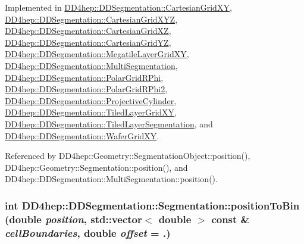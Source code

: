 Implemented in \hyperlink{class_d_d4hep_1_1_d_d_segmentation_1_1_cartesian_grid_x_y_a2a7d50d0a59d37116654b0f6a691f945}{DD4hep::DDSegmentation::CartesianGridXY}, \hyperlink{class_d_d4hep_1_1_d_d_segmentation_1_1_cartesian_grid_x_y_z_a029a72904042397250b67948270884ac}{DD4hep::DDSegmentation::CartesianGridXYZ}, \hyperlink{class_d_d4hep_1_1_d_d_segmentation_1_1_cartesian_grid_x_z_a44fb20b19214cb7a56e1d17e3edf3c5f}{DD4hep::DDSegmentation::CartesianGridXZ}, \hyperlink{class_d_d4hep_1_1_d_d_segmentation_1_1_cartesian_grid_y_z_aaad4f014c52e680a4954971d75d13357}{DD4hep::DDSegmentation::CartesianGridYZ}, \hyperlink{class_d_d4hep_1_1_d_d_segmentation_1_1_megatile_layer_grid_x_y_ab7f4500bd543bd2a837810f130b47539}{DD4hep::DDSegmentation::MegatileLayerGridXY}, \hyperlink{class_d_d4hep_1_1_d_d_segmentation_1_1_multi_segmentation_abbcc00c36274bb97c5ff3d01d64e45b6}{DD4hep::DDSegmentation::MultiSegmentation}, \hyperlink{class_d_d4hep_1_1_d_d_segmentation_1_1_polar_grid_r_phi_a91f53cd5367a3b7472713e2bd214bf57}{DD4hep::DDSegmentation::PolarGridRPhi}, \hyperlink{class_d_d4hep_1_1_d_d_segmentation_1_1_polar_grid_r_phi2_a5a61e856d814397d2be8046585266863}{DD4hep::DDSegmentation::PolarGridRPhi2}, \hyperlink{class_d_d4hep_1_1_d_d_segmentation_1_1_projective_cylinder_a4108a130ccc4573d4204318e975ad8bf}{DD4hep::DDSegmentation::ProjectiveCylinder}, \hyperlink{class_d_d4hep_1_1_d_d_segmentation_1_1_tiled_layer_grid_x_y_a1cf88ec570ea925ca8b324efae04ce04}{DD4hep::DDSegmentation::TiledLayerGridXY}, \hyperlink{class_d_d4hep_1_1_d_d_segmentation_1_1_tiled_layer_segmentation_a4e29a7791d15e076601c3edd0e350fd0}{DD4hep::DDSegmentation::TiledLayerSegmentation}, and \hyperlink{class_d_d4hep_1_1_d_d_segmentation_1_1_wafer_grid_x_y_a1f72c4a0bc0cfbabe6395612518a4d34}{DD4hep::DDSegmentation::WaferGridXY}.

Referenced by DD4hep::Geometry::SegmentationObject::position(), DD4hep::Geometry::Segmentation::position(), and DD4hep::DDSegmentation::MultiSegmentation::position().\hypertarget{class_d_d4hep_1_1_d_d_segmentation_1_1_segmentation_a9357e76769306a1bf6f92c8a5d8eb6b4}{
\subsubsection[{positionToBin}]{\setlength{\rightskip}{0pt plus 5cm}int DD4hep::DDSegmentation::Segmentation::positionToBin (double {\em position}, \/  std::vector$<$ double $>$ const \& {\em cellBoundaries}, \/  double {\em offset} = {.})}}
\label{class_d_d4hep_1_1_d_d_segmentation_1_1_segmentation_a9357e76769306a1bf6f92c8a5d8eb6b4}


